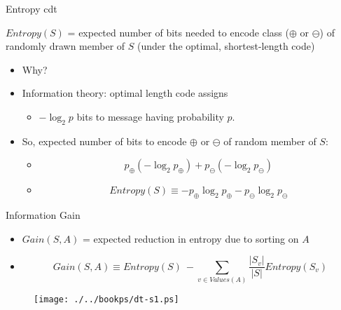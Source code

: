 \documentclass[%
pdf,
colorBG,
slideColor,
tcrico,
]{prosper}
\begin{document}
\begin{slide}{Entropy cdt} 
\tiny
\begin{description}
\item $Entropy(S)$ = expected number of bits needed to encode class ($\oplus$ or $\ominus$) of randomly drawn member of $S$ (under the optimal, shortest-length code)
\end{description}

\begin{itemize}
\item Why?
\item Information theory: optimal length code assigns 
	\begin{itemize}
	\item $- \log_{2}p$ bits to message having probability $p$.
	\end{itemize}
\item So, expected number of bits to encode $\oplus$ or $\ominus$ of random member
of $S$:
	\begin{itemize}
	\item \[ p_{\oplus} (-\log_{2} p_{\oplus}) + p_{\ominus} (-\log_{2} p_{\ominus}) \]
	\item \[ Entropy(S) \equiv  - p_{\oplus} \log_{2} p_{\oplus} -  p_{\ominus} \log_{2}
p_{\ominus} \]
	\end{itemize}
\end{itemize}
\end{slide}



\begin{slide}{Information Gain } 
\tiny
\begin{itemize}
\item $Gain(S,A)$ = expected reduction in entropy due to sorting on $A$
\item \[ Gain(S,A) \equiv Entropy(S)\ - \sum_{v \in Values(A)} \frac{|S_{v}|}{|S|}
Entropy(S_{v}) \]
\end{itemize}
\begin{figure}
	\centering
	\texttt{[image: ./../bookps/dt-s1.ps]}
\end{figure}
\end{slide}
\end{document}
